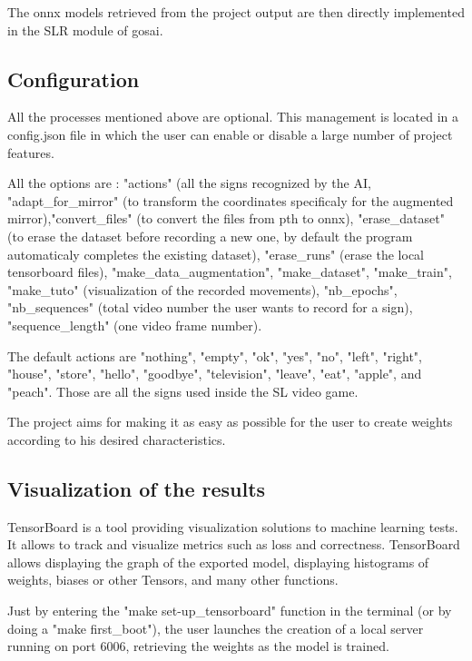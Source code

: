 The onnx models retrieved from the project output are then directly implemented in the SLR module of gosai.


\subsection{Configuration}

All the processes mentioned above are optional. This management is located in a config.json file in which the user can enable or disable a large number of project features. 

All the options are : "actions" (all the signs recognized by the AI, "adapt\_for\_mirror" (to transform the coordinates specificaly for the augmented mirror),"convert\_files" (to convert the files from pth to onnx), "erase\_dataset" (to erase the dataset before recording a new one, by default the program automaticaly completes the existing dataset), "erase\_runs" (erase the local tensorboard files), "make\_data\_augmentation", "make\_dataset", "make\_train", "make\_tuto"  (visualization of the recorded movements), "nb\_epochs", "nb\_sequences" (total video number the user wants to record for a sign), "sequence\_length" (one video frame number).

The default actions are "nothing", "empty", "ok", "yes", "no", "left", "right", "house", "store", "hello", "goodbye", "television", "leave", "eat", "apple", and "peach". Those are all the signs used inside the SL video game.

The project aims for making it as easy as possible for the user to create weights according to his desired characteristics.


\subsection{Visualization of the results}

TensorBoard is a tool providing visualization solutions to machine learning tests. It allows to track and visualize metrics such as loss and correctness. TensorBoard allows displaying the graph of the exported model, displaying histograms of weights, biases or other Tensors, and many other functions.

Just by entering the "make set-up\_tensorboard" function in the terminal (or by doing a "make first\_boot"), the user launches the creation of a local server running on port 6006, retrieving the weights as the model is trained. 

